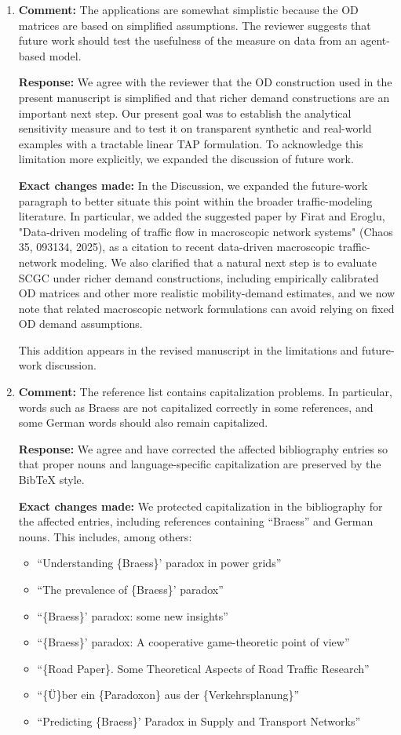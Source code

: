 \documentclass[11pt]{article}
\begin{document}
\begin{enumerate}
\item \textbf{Comment:} The applications are somewhat simplistic because the OD matrices are based on simplified assumptions. The reviewer suggests that future work should test the usefulness of the measure on data from an agent-based model.

\textbf{Response:} We agree with the reviewer that the OD construction used in the present manuscript is simplified and that richer demand constructions are an important next step. Our present goal was to establish the analytical sensitivity measure and to test it on transparent synthetic and real-world examples with a tractable linear TAP formulation. To acknowledge this limitation more explicitly, we expanded the discussion of future work.

\textbf{Exact changes made:} In the Discussion, we expanded the future-work paragraph to better situate this point within the broader traffic-modeling literature. In particular, we added the suggested paper by Firat and Eroglu, "Data-driven modeling of traffic flow in macroscopic network systems" (Chaos 35, 093134, 2025), as a citation to recent data-driven macroscopic traffic-network modeling. We also clarified that a natural next step is to evaluate SCGC under richer demand constructions, including empirically calibrated OD matrices and other more realistic mobility-demand estimates, and we now note that related macroscopic network formulations can avoid relying on fixed OD demand assumptions.

This addition appears in the revised manuscript in the limitations and future-work discussion.

\item \textbf{Comment:} The reference list contains capitalization problems. In particular, words such as Braess are not capitalized correctly in some references, and some German words should also remain capitalized.

\textbf{Response:} We agree and have corrected the affected bibliography entries so that proper nouns and language-specific capitalization are preserved by the BibTeX style.

\textbf{Exact changes made:} We protected capitalization in the bibliography for the affected entries, including references containing ``Braess'' and German nouns. This includes, among others:

\begin{itemize}
\item ``Understanding \{Braess\}' paradox in power grids''
\item ``The prevalence of \{Braess\}' paradox''
\item ``\{Braess\}' paradox: some new insights''
\item ``\{Braess\}' paradox: A cooperative game-theoretic point of view''
\item ``\{Road Paper\}. Some Theoretical Aspects of Road Traffic Research''
\item ``\{\"U\}ber ein \{Paradoxon\} aus der \{Verkehrsplanung\}''
\item ``Predicting \{Braess\}' Paradox in Supply and Transport Networks''
\end{itemize}


\end{enumerate}
\end{document}
